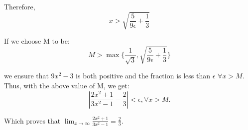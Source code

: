\documentclass[answers]{exam}
\theoremstyle{remark}
\theoremstyle{definition}
\begin{document}
\begin{questions}
\begin{solution}
Therefore,
\[x > \sqrt{\frac{5}{9 \epsilon} + \frac{1}{3}}\]

If we choose M to be:
\[M > \max\{\frac{1}{\sqrt{3}}, \sqrt{\frac{5}{9 \epsilon} + \frac{1}{3}}\}\]

we ensure that $9x^2 - 3$ is both positive and the fraction is less than $\epsilon$
$\forall x > M$. Thus, with the above value of M, we get:
\[|\frac{2x^2 + 1}{3x^2 - 1} - \frac{2}{3}| < \epsilon, \forall x > M.\]

Which proves that $\lim_{x \to \infty} \frac{2x^2 + 1}{3x^2 - 1} = \frac{2}{3}$.

\end{solution}

\end{questions}
\end{document}

